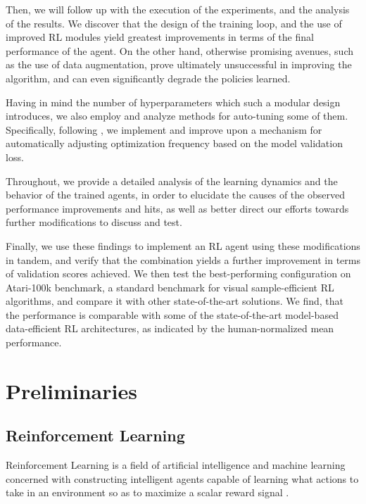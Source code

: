 \documentclass[en]{pracamgr}
\begin{document}
Then, we will follow up with the execution of the experiments, and the analysis of the results. We discover that the design of the training loop, and the use of improved RL modules yield greatest improvements in terms of the final performance of the agent. On the other hand, otherwise promising avenues, such as the use of data augmentation, prove ultimately unsuccessful in improving the algorithm, and can even significantly degrade the policies learned.

Having in mind the number of hyperparameters which such a modular design introduces, we also employ and analyze methods for auto-tuning some of them. Specifically, following \autocite{dorkaDynamicUpdatetoDataRatio2023}, we implement and improve upon a mechanism for automatically adjusting optimization frequency based on the model validation loss.

Throughout, we provide a detailed analysis of the learning dynamics and the behavior of the trained agents, in order to elucidate the causes of the observed performance improvements and hits, as well as better direct our efforts towards further modifications to discuss and test.

Finally, we use these findings to implement an RL agent using these modifications in tandem, and verify that the combination yields a further improvement in terms of validation scores achieved. We then test the best-performing configuration on Atari-100k benchmark, a standard benchmark for visual sample-efficient RL algorithms, and compare it with other state-of-the-art solutions. We find, that the performance is comparable with some of the state-of-the-art model-based data-efficient RL architectures, as indicated by the human-normalized mean performance.

\chapter{Preliminaries}

\section{Reinforcement Learning}

Reinforcement Learning is a field of artificial intelligence and machine learning concerned with constructing intelligent agents capable of learning what actions to take in an environment so as to maximize a scalar reward signal \autocite{sutton2018reinforcement}.
\end{document}
